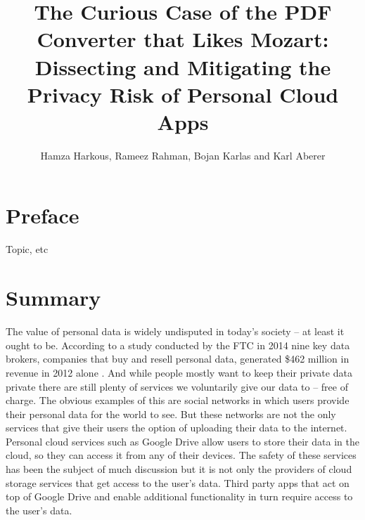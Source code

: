 \documentclass[11pt,twocolumn,a4paper,DIV=calc]{scrartcl}
\begin{document}
\title{The Curious Case of the PDF Converter that Likes Mozart: Dissecting and Mitigating the Privacy Risk of Personal Cloud Apps}
\author{Hamza Harkous, Rameez Rahman, Bojan Karlas and Karl Aberer}
\date{}
\maketitle
\section{Preface}
Topic, etc
\section{Summary}
The value of personal data is widely undisputed in today’s society – at least it ought to be. 
According to a study conducted by the FTC in 2014 nine key data brokers, companies that buy and resell personal data, generated \$462 million in revenue in 2012 alone \cite{FTCStudy}. 
And while people mostly want to keep their private data private \cite{WorthOfData} there are still plenty of services we voluntarily give our data to – free of charge. 
The obvious examples of this are social networks in which users provide their personal data for the world to see. 
But these networks are not the only services that give their users the option of uploading their data to the internet. Personal cloud services such as Google Drive allow users to store their data in the cloud, so they can access it from any of their devices. 
The safety of these services has been the subject of much discussion \cite{CloudSecurity} but it is not only the providers of cloud storage services that get access to the user’s data. 
Third party apps that act on top of Google Drive and enable additional functionality in turn require access to the user’s data.
\end{document}
